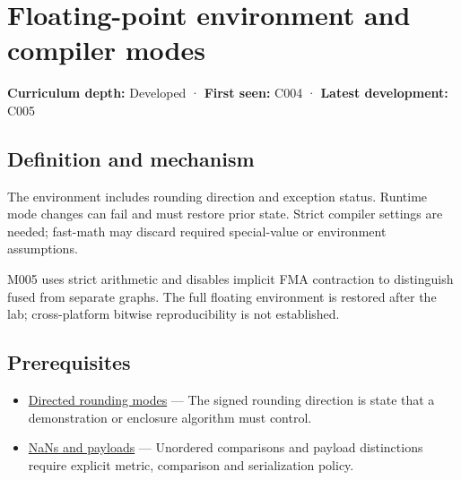 \hypertarget{appendix-f11d1a521253}{}\label{referencestart:appendix-f11d1a521253}
\section{Floating-point environment and compiler modes}\label{appendix-f11d1a521253-floating-point-environment-and-compiler-modes}

\hypertarget{appendix-f11d1a521253-floating-point-environment-and-compiler-modes}{}

\textbf{Curriculum depth:} Developed · \textbf{First seen:} C004 · \textbf{Latest development:} C005

\begin{allmightroledefinition}

\subsection{Definition and mechanism}\label{appendix-f11d1a521253-definition-and-mechanism}

\hypertarget{appendix-f11d1a521253-definition-and-mechanism}{}

The environment includes rounding direction and exception status. Runtime mode changes can fail and must restore prior state. Strict compiler settings are needed; fast-math may discard required special-value or environment assumptions.

\end{allmightroledefinition}

M005 uses strict arithmetic and disables implicit FMA contraction to distinguish fused from separate graphs. The full floating environment is restored after the lab; cross-platform bitwise reproducibility is not established.

\subsection{Prerequisites}\label{appendix-f11d1a521253-prerequisites}

\hypertarget{appendix-f11d1a521253-prerequisites}{}

\begin{itemize}
\tightlist
\item
  \hyperref[appendix-637d164ae5ca]{Directed rounding modes} --- The signed rounding direction is state that a demonstration or enclosure algorithm must control.
\item
  \hyperref[appendix-d6607cc4c235]{NaNs and payloads} --- Unordered comparisons and payload distinctions require explicit metric, comparison and serialization policy.
\end{itemize}

